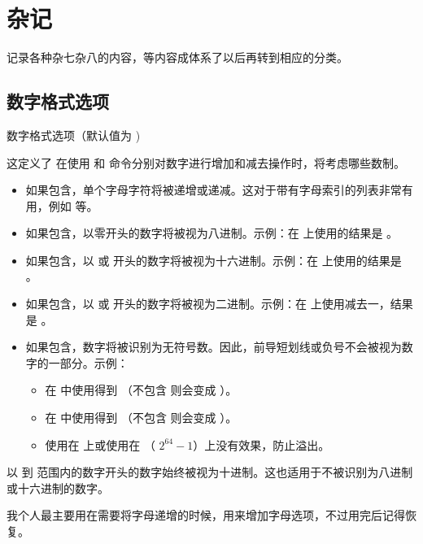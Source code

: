 \chapter{杂记}
记录各种杂七杂八的内容，等内容成体系了以后再转到相应的分类。

\section{数字格式选项}
 数字格式选项（默认值为 )

这定义了  在使用  和 
命令分别对数字进行增加和减去操作时，将考虑哪些数制。
\begin{itemize}
	\item {} 如果包含，单个字母字符将被递增或递减。这对于带有字母索引的列表非常有用，例如  等。
	\item {} 如果包含，以零开头的数字将被视为八进制。示例：在  上使用的结果是 。
	\item {} 如果包含，以  或  开头的数字将被视为十六进制。示例：在  上使用的结果是 。
	\item {} 如果包含，以  或  开头的数字将被视为二进制。示例：在  上使用减去一，结果是 。
	\item {} 如果包含，数字将被识别为无符号数。因此，前导短划线或负号不会被视为数字的一部分。示例：
	      \begin{itemize}
		      \item 在  中使用得到 （不包含  则会变成 ）。
		      \item 在  中使用得到 （不包含  则会变成 ）。
		      \item 使用在  上或使用在 （
		            \( 2^{64} - 1 \)）上没有效果，防止溢出。
	      \end{itemize}
\end{itemize}

以  到  范围内的数字开头的数字始终被视为十进制。这也适用于不被识别为八进制或十六进制的数字。

我个人最主要用在需要将字母递增的时候，用来增加字母选项，不过用完后记得恢复。
